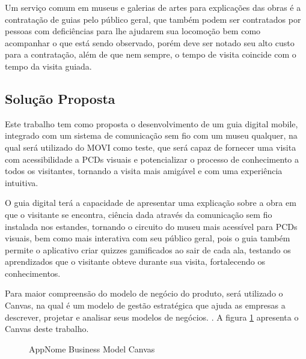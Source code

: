 Um serviço comum em museus e galerias de artes para explicações das obras é a contratação de guias pelo público geral, que também podem ser contratados por pessoas com deficiências para lhe ajudarem sua locomoção bem como acompanhar o que está sendo observado, porém deve ser notado seu alto custo para a contratação, além de que nem sempre, o tempo de visita coincide com o tempo da visita guiada. 

\subsection{Solução Proposta}

Este trabalho tem como proposta o desenvolvimento de um guia digital mobile, integrado com um sistema de comunicação sem fio com um museu qualquer, na qual será utilizado do MOVI como teste, que será capaz de fornecer uma visita com acessibilidade a PCDs visuais e potencializar o processo de conhecimento a todos os visitantes, tornando a visita mais amigável e com uma experiência intuitiva.

O guia digital terá a capacidade de apresentar uma explicação sobre a obra em que o visitante se encontra, ciência dada através da comunicação sem fio instalada nos estandes, tornando o circuito do museu mais acessível para PCDs visuais, bem como mais interativa com seu público geral, pois o guia também permite o aplicativo criar quizzes gamificados ao sair de cada ala, testando os aprendizados que o visitante obteve durante sua visita, fortalecendo os conhecimentos.

Para maior compreensão do modelo de negócio do produto, será utilizado o Canvas, na qual é um modelo de gestão estratégica que ajuda as empresas a descrever, projetar e analisar seus modelos de negócios. \cite{TheInteractionConsortium:Canvas}. A figura \ref{fig:canvas} apresenta o Canvas deste trabalho.

\begin{figure}[ht]
    \centering
    \caption{AppNome Business Model Canvas}
    \vspace{-0.3cm}
    \label{fig:canvas}
\end{figure}

